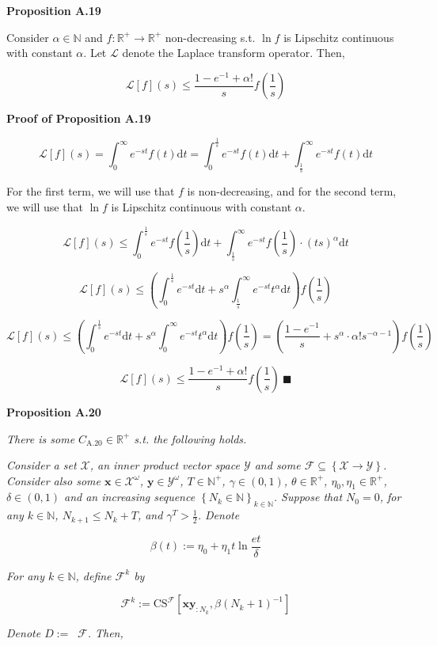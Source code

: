 \documentclass[a4paper]{article}
\newcommand{\Co}[1]{}
\newcommand{\AP}[1]{\left(#1\right)}
\newcommand{\AB}[1]{\left[#1\right]}
\newcommand{\AC}[1]{\left\{#1\right\}}
\newcommand{\Nats}{\mathbb{N}}
\newcommand{\Reals}{\mathbb{R}}
\newcommand{\D}{\mathrm{d}} %
\newcommand{\La}{\mathcal{L}}
\DeclareMathOperator{\RVO}{\dim_{RVO}}
\newcommand{\X}{\mathcal{X}}
\newcommand{\Y}{\mathcal{Y}}
\newcommand{\F}{\mathcal{F}}
\newcommand{\CS}{\mathrm{CS}}
\begin{document}
\textbf{Proposition A.19}\Co{b}

Consider $\alpha\in\Nats$ and $f:\Reals^+\rightarrow\Reals^+$ non-decreasing s.t. $\ln{f}$ is Lipschitz continuous with constant $\alpha$. Let $\La$ denote the Laplace transform operator. Then,

$$\La[f](s)\leq\frac{1-e^{-1}+\alpha!}{s}f\AP{\frac{1}{s}}$$

\textbf{Proof of Proposition A.19}\Co{b}

$$\La[f](s)=\int_0^\infty e^{-st}f(t)\D t=\int_0^{\frac{1}{s}}e^{-st}f(t)\D t+\int_{\frac{1}{s}}^\infty e^{-st}f(t)\D t$$

For the first term, we will use that $f$ is non-decreasing, and for the second term, we will use that $\ln{f}$ is Lipschitz continuous with constant $\alpha$.

$$\La[f](s)\leq\int_0^{\frac{1}{s}}e^{-st}f\AP{\frac{1}{s}}\D t+\int_{\frac{1}{s}}^\infty e^{-st}f\AP{\frac{1}{s}}\cdot\AP{ts}^\alpha\D t$$

$$\La[f](s)\leq\AP{\int_0^{\frac{1}{s}}e^{-st}\D t+s^\alpha\int_{\frac{1}{s}}^\infty e^{-st}t^\alpha\D t}f\AP{\frac{1}{s}}$$

$$\La[f](s)\leq\AP{\int_0^{\frac{1}{s}}e^{-st}\D t+s^\alpha\int_{0}^\infty e^{-st}t^\alpha\D t}f\AP{\frac{1}{s}}=\AP{\frac{1-e^{-1}}{s}+s^\alpha\cdot\alpha!s^{-\alpha-1}}f\AP{\frac{1}{s}}$$

$$\La[f](s)\leq\frac{1-e^{-1}+\alpha!}{s}f\AP{\frac{1}{s}}\ \blacksquare$$

\textbf{Proposition A.20}\Co{b}

\textit{There is some $C_{\mathrm{A.20}}\in\Reals^+$ s.t. the following holds.}\Co{i}

\textit{Consider a set $\X$, an inner product vector space $\Y$ and some $\F\subseteq\AC{\X\rightarrow\Y}$. Consider also some $\boldsymbol{x}\in\X^\omega$, $\boldsymbol{y}\in\Y^\omega$, $T\in\Nats^+$, $\gamma\in(0,1)$, $\theta\in\Reals^+$, $\eta_0,\eta_1\in\Reals^+$, $\delta\in(0,1)$ and an increasing sequence $\AC{N_k\in\Nats}_{k\in\Nats}$. Suppose that $N_0=0$, for any $k\in\Nats$, $N_{k+1}\leq N_k+T$, and $\gamma^T>\frac{1}{2}$. Denote}\Co{i}

$$\beta(t):=\eta_0 + \eta_1t\ln{\frac{et}{\delta}}$$

\textit{For any $k\in\Nats$, define $\F^k$ by}\Co{i}

$$\F^k:=\CS^\F\AB{\boldsymbol{xy}_{:N_k},\beta\AP{N_k+1}^{-1}}$$

\textit{Denote $D:=\RVO\F$. Then,}\Co{i}
\end{document}
